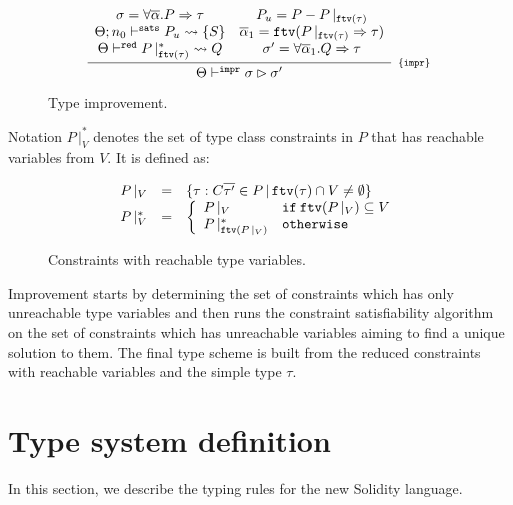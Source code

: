 \documentclass[a4paper, 11pt]{article}
\begin{document}
\begin{figure}[H]
  \[
    \infer[_{\{\mathtt{impr}\}}]
          {\Theta \impr \sigma \rhd \sigma'}
          {\begin{array}{cc}
            \sigma = \forall\overline{\alpha} . P \Rightarrow \tau & P_u = P - P\,|_{\ftv(\tau)} \\ 
            \Theta ; n_0 \vdash^{\mathtt{sats}} P_u \leadsto \{S\} & \overline{\alpha}_1 = \ftv(P\,|_{\ftv(\tau)} \Rightarrow \tau)\\
            \Theta \reduce P\,|^*_{\ftv(\tau)} \leadsto Q & \sigma' = \forall \overline{\alpha}_1 . Q\Rightarrow\tau\\ 
           \end{array}}
  \]
  \centering 
  \caption{Type improvement.}
  \label{fig:impr}
\end{figure}
 Notation $P\,|^*_{V}$ denotes the 
set of type class constraints in $P$ that has reachable variables 
from $V$. It is defined as: 
\begin{figure}[H]
  \[
    \begin{array}{lcl} 
      P\,|_{V} & = & \{\tau : C\overline{\tau'} \in P\,|\,\mathtt{ftv}(\tau) \cap V \neq \emptyset\}\\
      P\,|^{*}_{V} & = & \left\{
                  \begin{array}{ll}
                    P\,|_{V} & \mathtt{if}\:\mathtt{ftv}(P\,|_{V}) \subseteq V \\ 
                    P\,|^{*}_{\mathtt{ftv}(P\,|_{V})} & \mathtt{otherwise}\\
                  \end{array}
                   \right.
    \end{array} 
  \]
  \caption{Constraints with reachable type variables.}
  \label{fig:constrreach}
\end{figure}
Improvement starts by determining the set of constraints which 
has only unreachable type variables and then runs the constraint 
satisfiability algorithm on the set of constraints which has 
unreachable variables aiming to find a unique solution to them. 
The final type scheme is built from the reduced constraints with 
reachable variables and the simple type $\tau$.


\section{Type system definition}

In this section, we describe the typing rules for the new Solidity 
language.
\end{document}

